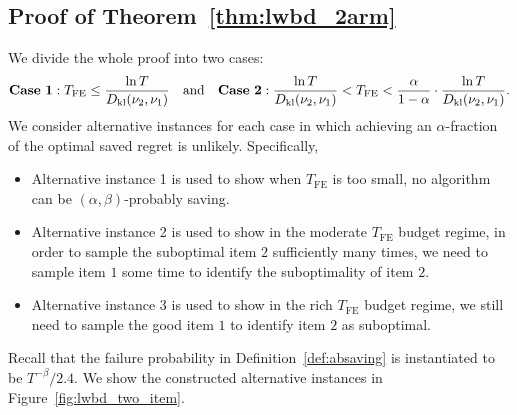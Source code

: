 \documentclass[twoside,11pt]{article}
\newcommand{\kl}{D_{\mathrm{kl}}}
\newcommand{\Tfe}{T_{\mathrm{FE}}}
\begin{document}
\subsection{Proof of Theorem~\ref{thm:lwbd_2arm}}\label{app:proof_lwbd_2arm}
We divide the whole proof into two cases: 
\begin{align}
{\bf Case~1}:    \Tfe\leq \frac{\ln T}{\kl(\nu_2,\nu_1)} \quad\mbox{and}\quad {\bf Case~2}:\frac{\ln T}{\kl(\nu_2,\nu_1)}<\Tfe<\frac{\alpha}{1-\alpha} \cdot \frac{\ln T}{\kl(\nu_2,\nu_1)}.   
\end{align}
We consider alternative instances for each case in which achieving an $\alpha$-fraction of the optimal saved regret is unlikely.
Specifically,
\begin{itemize}[leftmargin=1em,parsep=1pt,topsep=1pt]
    \item Alternative instance 1 is used to show when $\Tfe$ is too small, no algorithm can be $(\alpha,\beta)$-probably saving.
    \item Alternative instance 2 is used to show in the moderate $\Tfe$ budget regime, in order to sample the suboptimal item $2$ sufficiently many times, we need to sample item $1$ some time to identify the suboptimality of item $2$.
    \item Alternative instance 3 is used to show in the rich $\Tfe$ budget regime, we still need to sample the good item $1$ to identify item $2$ as suboptimal.
\end{itemize}
Recall that the failure probability in Definition~\ref{def:absaving} is instantiated to be $ T^{-\beta}/2.4.$
We show the constructed alternative instances in Figure~\ref{fig:lwbd_two_item}.
\end{document}
